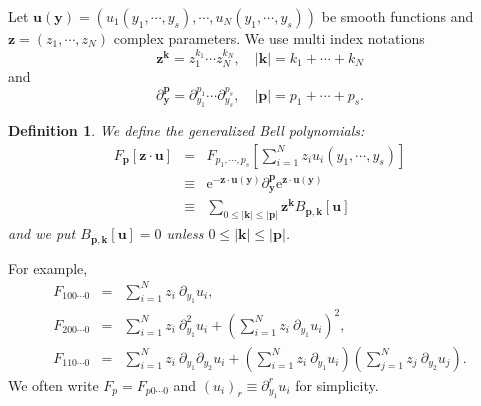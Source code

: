 \documentclass[makeidx,12pt,openany]{report}
\newtheorem{df}{Definition}[chapter]
\begin{document}
Let $\mathbf{u}(\mathbf{y})=(u_1(y_1,\cdots,y_s),\cdots,u_N(y_1,\cdots,y_s))$ 
be smooth functions and 
$\mathbf{z}=(z_1,\cdots,z_N)$ complex parameters. 
We use multi index notations
$$
\mathbf{z}^{\mathbf{k}}=z_1^{k_1}\cdots z_N^{k_N}, 
\quad |\mathbf{k}|=k_1+\cdots+k_N 
$$
and 
$$
\partial_{\mathbf{y}}^{\mathbf{p}}
=\partial_{y_1}^{p_1} \cdots \partial_{y_s}^{p_s}, 
\quad |\mathbf{p}|=p_1+\cdots+p_s. 
$$
\begin{df}
We define the generalized Bell polynomials:
\begin{eqnarray}
 F_{\mathbf{p}}[\mathbf{z}\cdot \mathbf{u}] 
 &=& F_{p_1,\cdots,p_s}[\sum_{i=1}^N z_i u_i(y_1,\cdots,y_s)] \nonumber\\
 &\equiv & \mbox{e}^{-\mathbf{z}\cdot \mathbf{u}(\mathbf{y})}
  \partial_{\mathbf{y}}^{\mathbf{p}}
  \mbox{e}^{\mathbf{z}\cdot \mathbf{u}(\mathbf{y})} \\
 &\equiv &\sum_{0 \le |\mathbf{k}| \le |\mathbf{p}|} 
           \mathbf{z}^{\mathbf{k}}B_{\mathbf{p}, \mathbf{k}}[\mathbf{u}]
  \label{eqn:genBellMat}
\end{eqnarray}
and we put $B_{\mathbf{p}, \mathbf{k}}[\mathbf{u}]=0$ unless 
$0 \le|\mathbf{k}| \le |\mathbf{p}|$. 
\end{df}
\noindent
For example, 
\begin{eqnarray*}
F_{100 \cdots 0}&=&\sum_{i=1}^N z_i \ \partial_{y_1} u_i, \\
F_{200 \cdots 0}&=&\sum_{i=1}^N z_i \ \partial_{y_1}^2 u_i
 +(\sum_{i=1}^N z_i \ \partial_{y_1} u_i)^2, \\
F_{110 \cdots 0}&=&\sum_{i=1}^N z_i \ \partial_{y_1}\partial_{y_2} u_i
 +(\sum_{i=1}^N z_i \ \partial_{y_1} u_i)
  (\sum_{j=1}^N z_j \ \partial_{y_2} u_j).
\end{eqnarray*}
\noindent
We often write 
$F_p=F_{p0\cdots 0}$ and 
$(u_i)_r \equiv \partial_{y_1}^r u_i$
for simplicity. 
\end{document}
